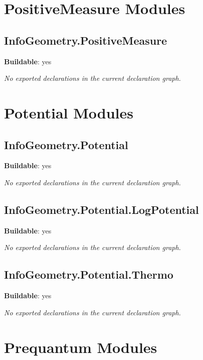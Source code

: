 \begin{theorem}[blueprint="infogeometryjordan:«term_⊙_»"]
\end{theorem}

\chapter{PositiveMeasure Modules}

\section{InfoGeometry.PositiveMeasure}

\noindent\textbf{Buildable}: yes

\noindent\emph{No exported declarations in the current declaration graph.}

\chapter{Potential Modules}

\section{InfoGeometry.Potential}

\noindent\textbf{Buildable}: yes

\noindent\emph{No exported declarations in the current declaration graph.}

\section{InfoGeometry.Potential.LogPotential}

\noindent\textbf{Buildable}: yes

\noindent\emph{No exported declarations in the current declaration graph.}

\section{InfoGeometry.Potential.Thermo}

\noindent\textbf{Buildable}: yes

\noindent\emph{No exported declarations in the current declaration graph.}

\chapter{Prequantum Modules}

